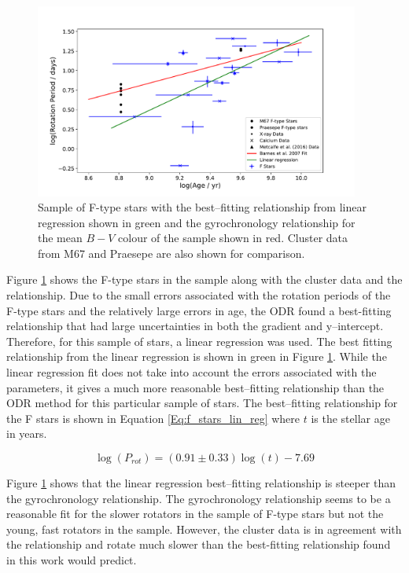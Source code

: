 \begin{figure}[!ht]
    \centering
    \includegraphics[width=0.95\textwidth]{Figures/5-Activity_rotation/f_prot_v_age_LR.pdf}
    \caption[Rotation period as a function of age for F-type stars]{Sample of F-type stars with the best--fitting relationship from linear regression shown in green and the \citet{Barnes_2007} gyrochronology relationship for the mean $B-V$ colour of the sample shown in red. Cluster data from M67 and Praesepe are also shown for comparison.}
    \label{fig:f_prot_v_age}
\end{figure}

Figure \ref{fig:f_prot_v_age} shows the F-type stars in the sample along with the cluster data and the \citet{Barnes_2007} relationship. Due to the small errors associated with the rotation periods of the F-type stars and the relatively large errors in age, the ODR found a best-fitting relationship that had large uncertainties in both the gradient and y--intercept. Therefore, for this sample of stars, a linear regression was used. The best fitting relationship from the linear regression is shown in green in Figure \ref{fig:f_prot_v_age}. While the linear regression fit does not take into account the errors associated with the parameters, it gives a much more reasonable best--fitting relationship than the ODR method for this particular sample of stars. The best--fitting relationship for the F stars is shown in Equation \ref{Eq:f_stars_lin_reg} where $t$ is the stellar age in years.

\begin{equation}
    \log(P_{rot}) = (0.91 \pm 0.33)\log(t) -7.69
    \label{Eq:f_stars_lin_reg}
\end{equation}


Figure \ref{fig:f_prot_v_age} shows that the linear regression best--fitting relationship is steeper than the gyrochronology relationship. The gyrochronology relationship seems to be a reasonable fit for the slower rotators in the sample of F-type stars but not the young, fast rotators in the sample. However, the cluster data is in agreement with the \citet{Barnes_2007} relationship and rotate much slower than the best-fitting relationship found in this work would predict.

